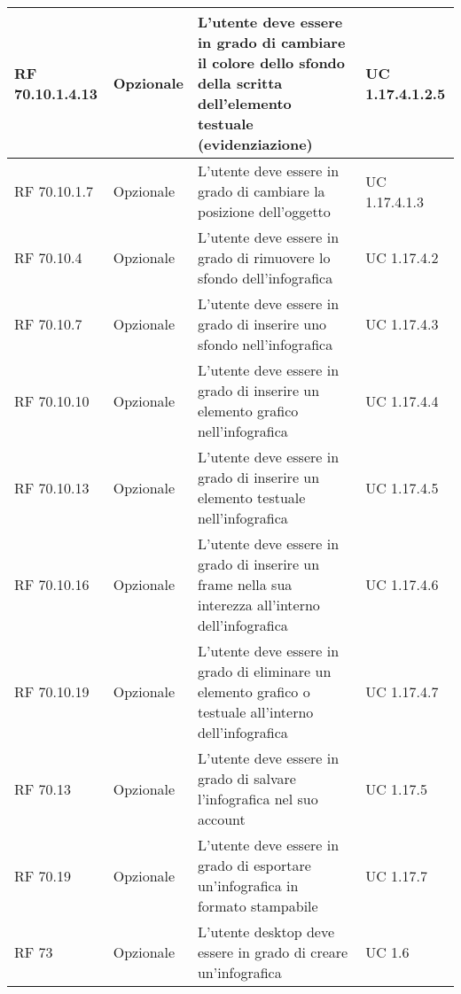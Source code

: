{\begin{longtable} [c]{| p{2.5cm} | p{2.5cm} | p{6cm} |p{2.5cm}|}
 \hline 
RF 70.10.1.4.13 & Opzionale & L'utente deve essere in grado di cambiare il colore dello sfondo della scritta dell'elemento testuale (evidenziazione) & UC 1.17.4.1.2.5\\ 
 \hline 
RF 70.10.1.7 & Opzionale & L'utente deve essere in grado di cambiare la posizione dell'oggetto & UC 1.17.4.1.3\\ 
 \hline 
RF 70.10.4 & Opzionale & L'utente deve essere in grado di rimuovere lo sfondo dell'infografica & UC 1.17.4.2\\ 
 \hline 
RF 70.10.7 & Opzionale & L'utente deve essere in grado di inserire uno sfondo nell'infografica & UC 1.17.4.3\\ 
 \hline 
RF 70.10.10 & Opzionale & L'utente deve essere in grado di inserire un elemento grafico nell'infografica & UC 1.17.4.4\\ 
 \hline 
RF 70.10.13 & Opzionale & L'utente deve essere in grado di inserire un elemento testuale nell'infografica & UC 1.17.4.5\\ 
 \hline 
RF 70.10.16 & Opzionale & L'utente deve essere in grado di inserire un frame nella sua interezza all'interno dell'infografica & UC 1.17.4.6\\ 
 \hline 
RF 70.10.19 & Opzionale & L'utente deve essere in grado di eliminare un elemento grafico o testuale all'interno dell'infografica & UC 1.17.4.7\\ 
 \hline 
RF 70.13 & Opzionale & L'utente deve essere in grado di salvare l'infografica nel suo account & UC 1.17.5\\ 
 \hline 
RF 70.19 & Opzionale & L'utente deve essere in grado di esportare un'infografica in formato stampabile & UC 1.17.7\\ 
 \hline 
RF 73 & Opzionale & L'utente desktop deve essere in grado di creare un'infografica & UC 1.6\\ 
 \hline 
\end{longtable}}